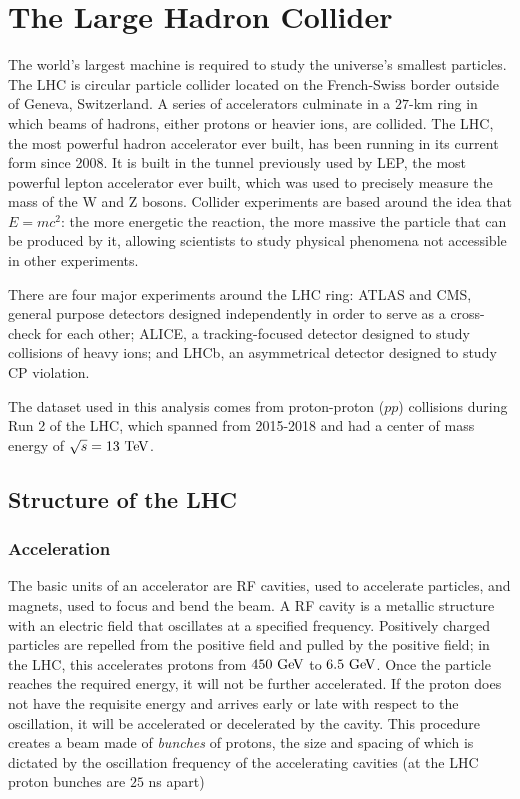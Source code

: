 \chapter{The Large Hadron Collider}

The world's largest machine is required to study the universe's smallest particles. The \ac{LHC} is circular particle collider located on the French-Swiss border outside of Geneva, Switzerland. A series of accelerators culminate in a $27$-km ring in which beams of hadrons, either protons or heavier ions, are collided. The \ac{LHC}, the most powerful hadron accelerator ever built, has been running in its current form since 2008. It is built in the tunnel previously used by \ac{LEP}, the most powerful lepton accelerator ever built, which was used to precisely measure the mass of the W and Z bosons. Collider experiments are based around the idea that $E=mc^2$: the more energetic the reaction, the more massive the particle that can be produced by it, allowing scientists to study physical phenomena not accessible in other experiments. 

There are four major experiments around the \ac{LHC} ring: \ac{ATLAS} and \ac{CMS}, general purpose detectors designed independently in order to serve as a cross-check for each other; \ac{ALICE}, a tracking-focused detector designed to study collisions of heavy ions; and \ac{LHCb}, an asymmetrical detector designed to study \ac{CP} violation. 

The dataset used in this analysis comes from proton-proton ($pp$) collisions during Run 2 of the \ac{LHC}, which spanned from 2015-2018 and had a center of mass energy of $\sqrt{s} = 13 \TeV$.

\section{Structure of the LHC}

\subsection{Acceleration}
The basic units of an accelerator are \ac{RF} cavities, used to accelerate particles, and magnets, used to focus and bend the beam. A \ac{RF} cavity is a metallic structure with an electric field that oscillates at a specified frequency. Positively charged particles are repelled from the positive field and pulled by the positive field; in the \ac{LHC}, this accelerates protons from $450 \GeV$ to $6.5 \GeV$. Once the particle reaches the required energy, it will not be further accelerated. If the proton does not have the requisite energy and arrives early or late with respect to the oscillation, it will be accelerated or decelerated by the cavity. This procedure creates a beam made of \emph{bunches} of protons, the size and spacing of which is dictated by the oscillation frequency of the accelerating cavities (at the \ac{LHC} proton bunches are $25$ ns apart)

